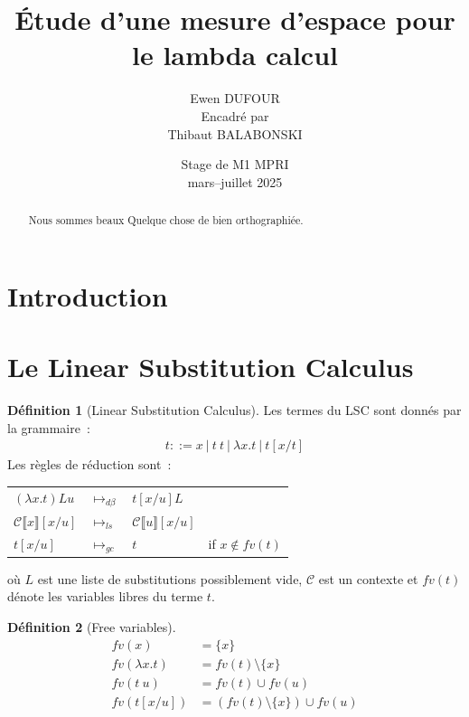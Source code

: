 \documentclass[11pt,a4paper]{article}
\title{Étude d'une mesure d'espace pour le lambda calcul}
\author{Ewen DUFOUR\\[1ex]
{\small Encadré par}\\ {\small Thibaut BALABONSKI}}
\date{Stage de M1 MPRI\\mars--juillet 2025}
\theoremstyle{definition}
\newtheorem{definition}{Définition}[section]
\begin{document}
\maketitle

\begin{abstract}
  Nous sommes beaux Quelque chose de bien orthographiée.
\end{abstract}

\tableofcontents
\section{Introduction}
\section{Le Linear Substitution Calculus}

\begin{definition}[Linear Substitution Calculus]
Les termes du LSC sont donnés par la grammaire~:
\begin{align*}
    t ::= x~|~t~t~|~\lambda x.t~|~t[x / t]
\end{align*}
Les règles de réduction sont~:
\begin{center}
\begin{tabular}{l l l l }
$(\lambda x.t)Lu$ &$\mapsto_{d\beta}$ &$t[x / u]L$ & \\
$\mathcal{C}\llbracket x \rrbracket [x / u]$ &$\mapsto_{ls}$ &$\mathcal{C}\llbracket u \rrbracket [x / u]$ & \\
$t[x / u]$ &$\mapsto_{gc}$ &$t$ & if $x\notin fv(t)$
\end{tabular}
\end{center}
 où $L$ est une liste de substitutions possiblement vide, $\mathcal{C}$ est un contexte et $fv(t)$ dénote les variables libres du terme $t$.
\end{definition}
\begin{definition}[Free variables]
\begin{align*}
    fv(x) &= \{ x \} \\
    fv(\lambda x.t) &= fv(t) \setminus \{ x \} \\
    fv(t~u) &= fv(t) \cup fv(u) \\
    fv(t[x/u]) &= (fv(t) \setminus \{ x \}) \cup fv(u) \\
\end{align*}
\end{definition}
\end{document}
